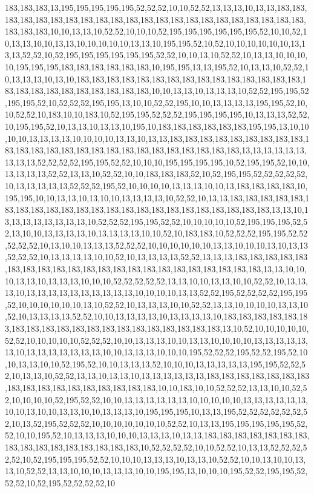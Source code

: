 183,183,183,13,195,195,195,195,195,52,52,52,10,10,52,52,13,13,13,10,13,13,183,183,183,183,183,183,183,183,183,183,183,183,183,183,183,183,183,183,183,183,183,183,183,183,183,10,10,13,13,10,52,52,10,10,10,52,195,195,195,195,195,195,52,10,10,52,10,13,13,10,10,13,13,10,10,10,10,10,13,13,10,195,195,52,10,52,10,10,10,10,10,10,13,13,13,52,52,10,52,195,195,195,195,195,195,52,52,10,10,13,10,52,52,10,13,13,10,10,10,10,195,195,195,183,183,183,183,183,183,10,195,195,13,13,195,52,10,13,13,10,52,52,10,13,13,13,10,13,10,183,183,183,183,183,183,183,183,183,183,183,183,183,183,183,183,183,183,183,183,183,183,183,183,183,10,10,13,13,10,13,13,13,10,52,52,195,195,52,195,195,52,10,52,52,52,195,195,13,10,10,52,52,195,10,10,13,13,13,13,195,195,52,10,10,52,52,10,183,10,10,183,10,52,195,195,52,52,52,195,195,195,195,10,13,13,13,52,52,10,195,195,52,10,13,13,10,13,13,10,195,10,183,183,183,183,183,183,195,195,13,10,10,10,10,13,13,13,13,10,10,10,10,13,13,10,13,13,183,183,183,183,183,183,183,183,183,183,183,183,183,183,183,183,183,183,183,183,183,183,183,183,183,13,13,13,13,13,13,13,13,13,52,52,52,52,195,195,52,52,10,10,10,195,195,195,195,10,52,195,195,52,10,10,13,13,13,13,52,52,13,13,10,52,52,10,10,183,183,183,52,10,52,195,195,52,52,52,52,52,10,13,13,13,13,13,52,52,52,195,52,10,10,10,10,13,13,13,10,10,13,183,183,183,183,10,195,195,10,10,13,13,10,13,10,10,13,13,13,13,10,52,52,10,13,13,183,183,183,183,183,183,183,183,183,183,183,183,183,183,183,183,183,183,183,183,183,183,183,13,13,10,13,13,13,13,13,13,13,13,10,52,52,52,195,195,52,52,10,10,10,10,10,52,195,195,195,52,52,13,10,10,13,13,13,13,10,13,13,13,13,10,10,52,10,183,183,10,52,52,52,195,195,52,52,52,52,52,10,13,10,10,13,13,13,52,52,52,10,10,10,10,10,10,13,13,10,10,10,13,10,13,13,52,52,52,10,13,13,13,13,10,10,52,10,13,13,13,13,52,52,13,13,13,183,183,183,183,183,183,183,183,183,183,183,183,183,183,183,183,183,183,183,183,183,183,13,13,10,10,10,13,13,10,13,13,13,10,10,10,52,52,52,52,52,13,13,10,10,13,13,10,10,52,52,10,13,13,13,10,13,13,13,13,13,13,13,13,13,13,10,10,10,10,13,13,52,52,195,52,52,52,52,195,195,52,10,10,10,10,10,10,13,10,52,52,10,13,13,13,10,10,52,52,13,13,10,10,10,10,13,13,10,52,10,13,13,13,13,52,52,10,10,13,13,13,13,10,13,13,13,13,10,183,183,183,183,183,183,183,183,183,183,183,183,183,183,183,183,183,183,183,183,13,10,52,10,10,10,10,10,52,52,10,10,10,10,10,52,52,52,10,10,13,13,13,10,10,13,13,10,10,10,10,13,13,13,13,13,13,10,13,13,13,13,13,13,13,10,10,13,13,13,10,10,10,195,52,52,52,195,52,52,195,52,10,10,13,13,10,10,52,195,52,10,10,13,13,13,52,10,10,10,13,13,13,13,13,195,195,52,52,52,10,13,13,10,52,52,13,13,10,13,13,10,13,13,13,13,13,13,183,183,183,183,183,183,183,183,183,183,183,183,183,183,183,183,183,10,10,183,10,10,52,52,52,13,13,10,10,52,52,10,10,10,10,52,195,52,52,10,10,13,13,13,13,13,13,10,10,10,10,10,13,13,13,13,13,13,10,10,13,10,10,13,13,10,10,13,13,13,10,195,195,195,10,13,13,195,52,52,52,52,52,52,52,10,13,52,195,52,52,52,10,10,10,10,10,10,10,52,52,10,13,13,195,195,195,195,195,52,52,10,10,195,52,10,13,13,13,10,10,10,13,13,13,10,13,13,183,183,183,183,183,183,183,183,183,183,183,183,183,183,183,183,10,52,52,52,52,10,10,52,52,10,13,13,52,52,52,52,52,10,52,195,195,195,52,52,10,10,10,13,13,13,10,13,13,10,52,52,10,10,13,10,10,13,13,10,52,52,13,13,10,10,10,13,13,13,10,10,195,195,13,10,10,10,195,52,52,195,195,52,52,52,10,52,195,52,52,52,52,10